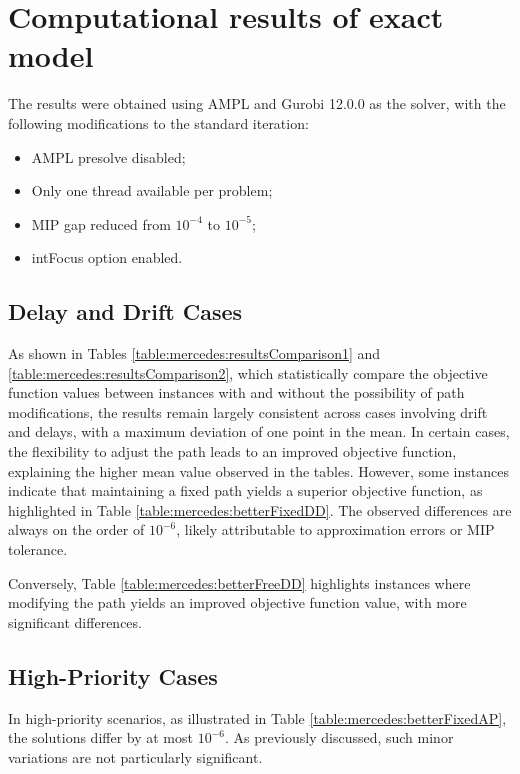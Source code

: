 \documentclass[../../../thesis.tex]{subfiles}
\begin{document}
\section{Computational results of exact model}
The results were obtained using AMPL and Gurobi 12.0.0 as the solver, with the following modifications to the standard iteration:
\begin{itemize}
    \item AMPL presolve disabled;
    \item Only one thread available per problem;
    \item MIP gap reduced from $10^{-4}$ to $10^{-5}$;
    \item intFocus option enabled.
\end{itemize}

\subsection{Delay and Drift Cases}
As shown in Tables \ref{table:mercedes:resultsComparison1} and \ref{table:mercedes:resultsComparison2}, which statistically compare the objective function values between instances with and without the possibility of path modifications, the results remain largely consistent across cases involving drift and delays, with a maximum deviation of one point in the mean.
In certain cases, the flexibility to adjust the path leads to an improved objective function, explaining the higher mean value observed in the tables. However, some instances indicate that maintaining a fixed path yields a superior objective function, as highlighted in Table \ref{table:mercedes:betterFixedDD}.
The observed differences are always on the order of $10^{-6}$, likely attributable to approximation errors or MIP tolerance.



Conversely, Table \ref{table:mercedes:betterFreeDD} highlights instances where modifying the path yields an improved objective function value, with more significant differences.



\subsection{High-Priority Cases}
In high-priority scenarios, as illustrated in Table \ref{table:mercedes:betterFixedAP}, the solutions differ by at most $10^{-6}$. As previously discussed, such minor variations are not particularly significant.
\end{document}
